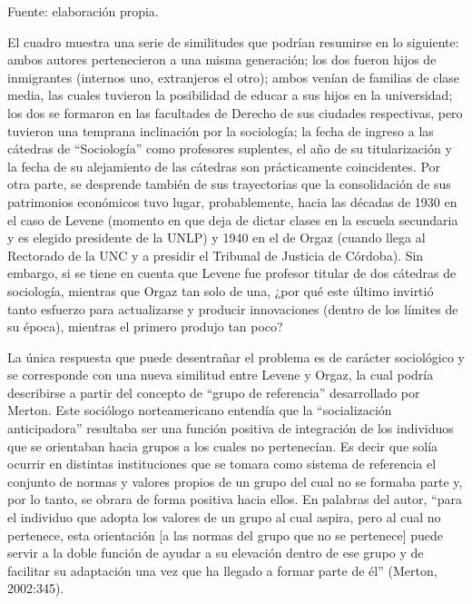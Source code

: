 Fuente: elaboración propia.

El cuadro muestra una serie de similitudes que podrían resumirse en lo siguiente: ambos autores pertenecieron a una misma generación; los dos fueron hijos de inmigrantes (internos uno, extranjeros el otro); ambos venían de familias de clase media, las cuales tuvieron la posibilidad de educar a sus hijos en la universidad; los dos se formaron en las facultades de Derecho de sus ciudades respectivas, pero tuvieron una temprana inclinación por la sociología; la fecha de ingreso a las cátedras de ``Sociología'' como profesores suplentes, el año de su titularización y la fecha de su alejamiento de las cátedras son prácticamente coincidentes. Por otra parte, se desprende también de sus trayectorias que la consolidación de sus patrimonios económicos tuvo lugar, probablemente, hacia las décadas de 1930 en el caso de Levene (momento en que deja de dictar clases en la escuela secundaria y es elegido presidente de la UNLP) y 1940 en el de Orgaz (cuando llega al Rectorado de la UNC y a presidir el Tribunal de Justicia de Córdoba). Sin embargo, si se tiene en cuenta que Levene fue profesor titular de dos cátedras de sociología, mientras que Orgaz tan solo de una, ¿por qué este último invirtió tanto esfuerzo para actualizarse y producir innovaciones (dentro de los límites de su época), mientras el primero produjo tan poco?

La única respuesta que puede desentrañar el problema es de carácter sociológico y se corresponde con una nueva similitud entre Levene y Orgaz, la cual podría describirse a partir del concepto de ``grupo de referencia'' desarrollado por Merton. Este sociólogo norteamericano entendía que la ``socialización anticipadora'' resultaba ser una función positiva de integración de los individuos que se orientaban hacia grupos a los cuales no pertenecían. Es decir que solía ocurrir en distintas instituciones que se tomara como sistema de referencia el conjunto de normas y valores propios de un grupo del cual no se formaba parte y, por lo tanto, se obrara de forma positiva hacia ellos. En palabras del autor, ``para el individuo que adopta los valores de un grupo al cual aspira, pero al cual no pertenece, esta orientación {[}a las normas del grupo que no se pertenece{]} puede servir a la doble función de ayudar a su elevación dentro de ese grupo y de facilitar su adaptación una vez que ha llegado a formar parte de él'' (Merton, 2002:345).


